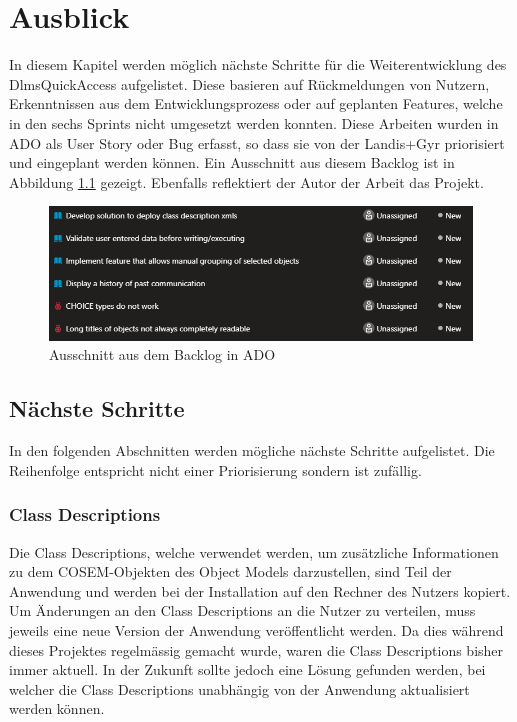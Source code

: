 
\chapter{Ausblick}\label{ausblick}
In diesem Kapitel werden möglich nächste Schritte für die Weiterentwicklung des DlmsQuickAccess aufgelistet.
Diese basieren auf  Rückmeldungen von Nutzern, Erkenntnissen aus dem Entwicklungsprozess oder auf geplanten Features, welche in den sechs Sprints nicht umgesetzt werden konnten.  
Diese Arbeiten wurden in \ac{ADO} als User Story oder Bug erfasst, so dass sie von der Landis+Gyr priorisiert und eingeplant werden können.
Ein Ausschnitt aus diesem Backlog ist in Abbildung \ref{fig:ADOBacklog} gezeigt.
Ebenfalls reflektiert der Autor der Arbeit das Projekt.
\begin{figure}[H]
   \centering
   \includegraphics[width=1.0\textwidth]{gfx/ADOBacklog.png}
   \caption{
      Ausschnitt aus dem Backlog in \ac{ADO}
      }
   \label{fig:ADOBacklog}
\end{figure}


\section{Nächste Schritte}\label{nextSteps}
In den folgenden Abschnitten werden mögliche nächste Schritte aufgelistet.
Die Reihenfolge entspricht nicht einer Priorisierung sondern ist zufällig.

\subsection{Class Descriptions}
Die Class Descriptions, welche verwendet werden, um zusätzliche Informationen zu dem \ac{COSEM}-Objekten des Object Models darzustellen, sind Teil der Anwendung und werden bei der Installation auf den Rechner des Nutzers kopiert.
Um Änderungen an den Class Descriptions an die Nutzer zu verteilen, muss jeweils eine neue Version der Anwendung veröffentlicht werden.
Da dies während dieses Projektes regelmässig gemacht wurde, waren die Class Descriptions bisher immer aktuell.
In der Zukunft sollte jedoch eine Lösung gefunden werden, bei welcher die Class Descriptions unabhängig von der Anwendung aktualisiert werden können.

